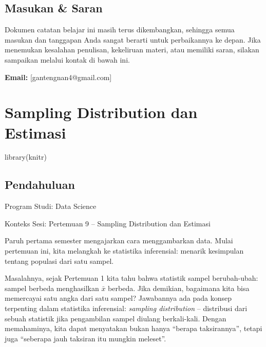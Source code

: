 \documentclass[
  indonesian,
  letterpaper,
]{book}
\newenvironment{Shaded}{\begin{snugshade}}{\end{snugshade}}
\newcommand{\FunctionTok}[1]{\textcolor[rgb]{0.28,0.35,0.67}{#1}}
\newcommand{\NormalTok}[1]{\textcolor[rgb]{0.00,0.23,0.31}{#1}}
\begin{document}
\section*{Masukan \& Saran}\label{masukan-saran}


Dokumen catatan belajar ini masih terus dikembangkan, sehingga semua
masukan dan tanggapan Anda sangat berarti untuk perbaikannya ke depan.
Jika menemukan kesalahan penulisan, kekeliruan materi, atau memiliki
saran, silakan sampaikan melalui kontak di bawah ini.

\textbf{Email:} {[}gantengnan4@gmail.com{]}


\chapter{Sampling Distribution dan
Estimasi}\label{sampling-distribution-dan-estimasi}

\begin{Shaded}
\begin{Highlighting}[]
\FunctionTok{library}\NormalTok{(knitr)}
\end{Highlighting}
\end{Shaded}

\section{Pendahuluan}\label{pendahuluan}

Program Studi: Data Science

Konteks Sesi: Pertemuan 9 -- Sampling Distribution dan Estimasi

Paruh pertama semester mengajarkan cara menggambarkan data. Mulai
pertemuan ini, kita melangkah ke statistika inferensial: menarik
kesimpulan tentang populasi dari satu sampel.

Masalahnya, sejak Pertemuan 1 kita tahu bahwa statistik sampel
berubah-ubah: sampel berbeda menghasilkan \(\bar{x}\) berbeda. Jika
demikian, bagaimana kita bisa memercayai satu angka dari satu sampel?
Jawabannya ada pada konsep terpenting dalam statistika inferensial:
\emph{sampling distribution} -- distribusi dari sebuah statistik jika
pengambilan sampel diulang berkali-kali. Dengan memahaminya, kita dapat
menyatakan bukan hanya ``berapa taksirannya'', tetapi juga ``seberapa
jauh taksiran itu mungkin meleset''.
\end{document}
